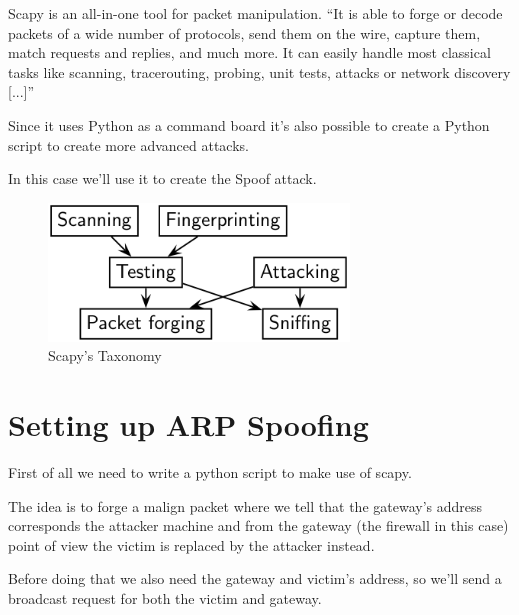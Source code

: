 Scapy is an all-in-one tool for packet manipulation.
``It is able to forge or decode packets of a wide number of protocols, send them on the wire, capture them, match requests and replies, and much more. It can easily handle most classical tasks like scanning, tracerouting, probing, unit tests, attacks or network discovery [...]''\cite{scapy}

Since it uses Python as a command board it's also possible to create a Python script to create more advanced attacks.

In this case we'll use it to create the  Spoof attack.

\begin{figure}[h!]
 \centering
 \includegraphics[width=8cm]{img/testing-taxonomy.png}
 \caption{Scapy's Taxonomy}
 \label{fig: scapy taxonomy}
\end{figure}


\newpage

\section{Setting up ARP Spoofing}

First of all we need to write a python script to make use of scapy.

The idea is to forge a malign  packet where we tell that the gateway's  address corresponds the attacker machine and from the gateway (the firewall in this case) point of view the victim is replaced by the attacker instead.

Before doing that we also need the gateway and victim's  address, so we'll send a broadcast  request for both the victim and gateway.

